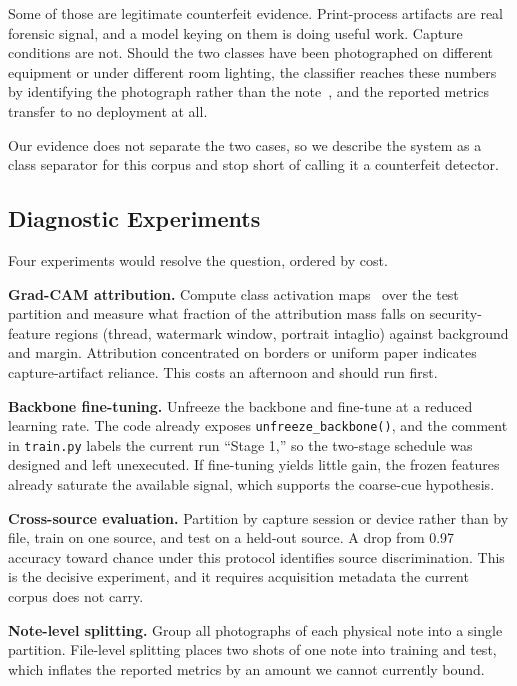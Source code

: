 \documentclass[conference]{IEEEtran}
\begin{document}
Some of those are legitimate counterfeit evidence. Print-process artifacts are
real forensic signal, and a model keying on them is doing useful work. Capture
conditions are not. Should the two classes have been photographed on different
equipment or under different room lighting, the classifier reaches these numbers
by identifying the photograph rather than the note~\cite{torralba2011bias}, and
the reported metrics transfer to no deployment at all.

Our evidence does not separate the two cases, so we describe the system as a
class separator for this corpus and stop short of calling it a counterfeit
detector.

\subsection{Diagnostic Experiments}
\label{sec:protocol}

Four experiments would resolve the question, ordered by cost.

\textbf{Grad-CAM attribution.} Compute class activation
maps~\cite{selvaraju2017gradcam} over the test partition and measure what
fraction of the attribution mass falls on security-feature regions (thread,
watermark window, portrait intaglio) against background and margin. Attribution
concentrated on borders or uniform paper indicates capture-artifact reliance.
This costs an afternoon and should run first.

\textbf{Backbone fine-tuning.} Unfreeze the backbone and fine-tune at a reduced
learning rate. The code already exposes \texttt{unfreeze\_backbone()}, and the
comment in \texttt{train.py} labels the current run ``Stage 1,'' so the two-stage
schedule was designed and left unexecuted. If fine-tuning yields little gain,
the frozen features already saturate the available signal, which supports the
coarse-cue hypothesis.

\textbf{Cross-source evaluation.} Partition by capture session or device rather
than by file, train on one source, and test on a held-out source. A drop from
0.97 accuracy toward chance under this protocol identifies source
discrimination. This is the decisive experiment, and it requires acquisition
metadata the current corpus does not carry.

\textbf{Note-level splitting.} Group all photographs of each physical note into
a single partition. File-level splitting places two shots of one note into
training and test, which inflates the reported metrics by an amount we cannot
currently bound.
\end{document}
